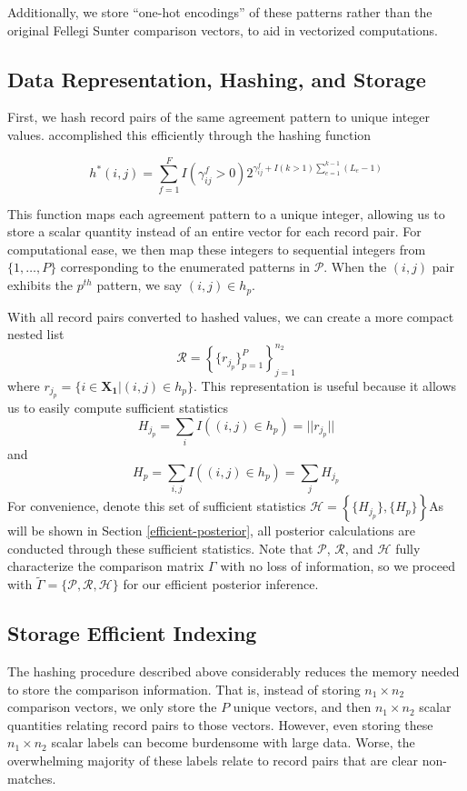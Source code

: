 \documentclass[12pt,letterpaper]{article}
\newcommand{\1}[1]{\mathbb{I}\!\left[#1\right]} %
\begin{document}
Additionally, we store ``one-hot encodings'' of these patterns rather than the original Fellegi Sunter comparison vectors, to aid in vectorized computations.  

\hypertarget{data-representation-hashing-and-storage}{%
	\subsection{Data Representation, Hashing, and
		Storage}\label{data-representation-hashing-and-storage}}

First, we hash record pairs of the same agreement pattern to unique integer values. \cite{enamorado2019using} accomplished this efficiently through the hashing function

$$h^{*}(i, j) = \sum_{f = 1}^F I(\gamma_{ij}^f > 0)2^{\gamma_{ij}^f + I(k>1)\sum_{e=1}^{k-1}(L_e -1)}$$

This function maps each agreement pattern to a unique integer, allowing us to store a scalar quantity instead of an entire vector for each record pair. For computational ease, we then map these integers to sequential integers from $\{1, \ldots, P\}$ corresponding to the enumerated patterns in $\mathcal{P}$. When the $(i, j)$ pair exhibits the $p^{th}$ pattern, we say $(i, j) \in h_p$.

With all record pairs converted to hashed values, we can create a more compact nested list 
$$\mathcal{R} = \left\{\{r_{j_p} \}_{p=1}^{P} \right\}_{j = 1}^{n_2}$$
where $r_{j_p} = \{i \in \bm{X_1} | (i, j) \in h_p\}$. This representation is useful because it allows us to easily compute sufficient statistics
$$H_{j_p} = \sum_{i} I((i, j) \in h_p) = ||r_{j_p}||$$
and
$$H_p =  \sum_{i, j} I((i, j) \in h_p) = \sum_{j} H_{j_p}$$
For convenience, denote this set of sufficient statistics $\mathcal{H} = \left\{\{H_{j_p}\}, \{H_{p}\}\right\}$As will be shown in Section \ref{efficient-posterior}, all posterior calculations are conducted through these sufficient statistics. Note that $\mathcal{P}$, $\mathcal{R}$, and $\mathcal{H}$  fully characterize the comparison matrix $\Gamma$ with no loss of information, so we proceed with $\tilde{\Gamma} = \{\mathcal{P}, \mathcal{R}, \mathcal{H}\}$ for our efficient posterior inference. 

\hypertarget{SEI}{%
	\subsection{Storage Efficient Indexing}\label{SEI}}

The hashing procedure described above considerably reduces the memory
needed to store the comparison information. That is, instead of storing
\(n_1 \times n_2\) comparison vectors, we only store the
\(P\) unique vectors, and then \(n_1 \times n_2\) scalar quantities
relating record pairs to those vectors. However, even storing these
\(n_1 \times n_2\) scalar labels can become burdensome with large data.
Worse, the overwhelming majority of these labels relate to record pairs
that are clear non-matches.
\end{document}
